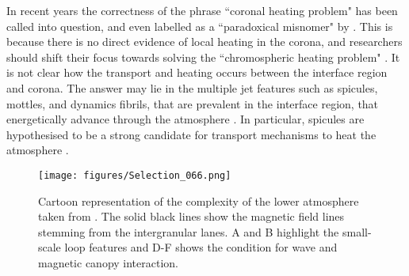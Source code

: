 In recent years the correctness of the phrase ``coronal heating problem" has been called into question, and even labelled as a ``paradoxical misnomer" by \cite{Aschwanden2007ApJ}. This is because there is no direct evidence of local heating in the corona, and researchers should shift their focus towards solving the ``chromospheric heating problem" \citep{Aschwanden2007ApJ}. It is not clear how the transport and heating occurs between the interface region and corona. The answer may lie in the multiple jet features such as spicules, mottles, and dynamics fibrils, that are prevalent in the interface region, that energetically advance through the atmosphere \citep{Tsiropoula2012}. In particular, spicules are hypothesised to be a strong candidate for transport mechanisms to heat the atmosphere \citep{Kudoh1999ApJ514493K, Pontieu2007PASJ, Kudoh2008IAUS247195K, Mart2017Sci3561269M,Moore2011ApJ731L18M, Pontieu2017ApJ, Samanta2019Sci, Zuo2019AcASn, Bale2019Natur}.    

\begin{sidewaysfigure}[ht]
    \texttt{[image: figures/Selection\_066.png]}
    \caption{Cartoon representation of the complexity of the lower atmosphere taken from \cite{Wedemeyer2009SSRv144317W}. The solid black lines show the magnetic field lines stemming from the intergranular lanes. A and B highlight the small-scale loop features and D-F shows the condition for wave and magnetic canopy interaction.}
    \label{fig:chromo_Cart}
\end{sidewaysfigure}
